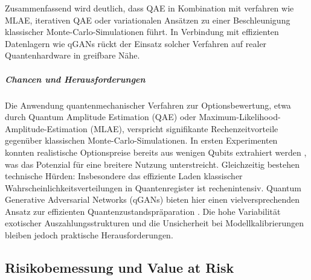 Zusammenfassend wird deutlich, dass QAE in Kombination mit verfahren wie MLAE, iterativen QAE oder variationalen Ansätzen zu einer Beschleunigung klassischer Monte-Carlo-Simulationen führt. In Verbindung mit effizienten Datenlagern wie qGANs rückt der Einsatz solcher Verfahren auf realer Quantenhardware in greifbare Nähe.

\subparagraph{Chancen und Herausforderungen}

Die Anwendung quantenmechanischer Verfahren zur Optionsbewertung, etwa durch Quantum Amplitude Estimation (QAE) oder Maximum-Likelihood-Amplitude-Estimation (MLAE), verspricht signifikante Rechenzeitvorteile gegenüber klassischen Monte-Carlo-Simulationen. In ersten Experimenten konnten realistische Optionspreise bereits aus wenigen Qubits extrahiert werden \cite[S. 4–6]{stamatopoulos_option_2020}, was das Potenzial für eine breitere Nutzung unterstreicht. Gleichzeitig bestehen technische Hürden: Insbesondere das effiziente Laden klassischer Wahrscheinlichkeitsverteilungen in Quantenregister ist rechenintensiv. Quantum Generative Adversarial Networks (qGANs) bieten hier einen vielversprechenden Ansatz zur effizienten Quantenzustandspräparation \cite[S. 1–3]{zoufal_quantum_2019}. Die hohe Variabilität exotischer Auszahlungsstrukturen und die Unsicherheit bei Modellkalibrierungen bleiben jedoch praktische Herausforderungen.

\subsection{Risikobemessung und Value at Risk}

